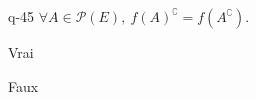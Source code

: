 \begin{truefalse}{q-45}
$\forall A\in\mathcal{P}(E),\ f(A)^{\complement}=f(A^{\complement})$.
\item Vrai
\item* Faux
\end{truefalse}

